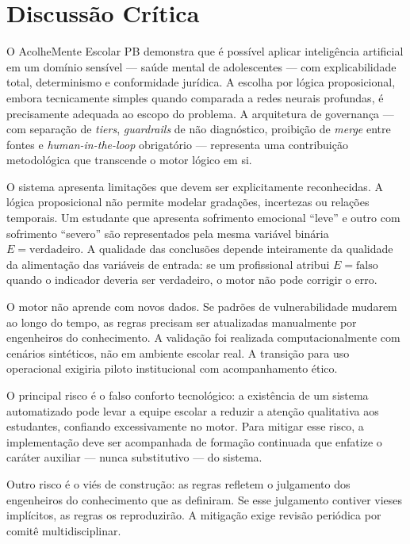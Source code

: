 \documentclass[
    12pt,
    openright,
    oneside,
    a4paper,
    english,
    brazil
]{abntex2}
\begin{document}
\chapter{Discussão Crítica}

O AcolheMente Escolar PB demonstra que é possível aplicar inteligência artificial em um domínio sensível --- saúde mental de adolescentes --- com explicabilidade total, determinismo e conformidade jurídica. A escolha por lógica proposicional, embora tecnicamente simples quando comparada a redes neurais profundas, é precisamente adequada ao escopo do problema. A arquitetura de governança --- com separação de \textit{tiers}, \textit{guardrails} de não diagnóstico, proibição de \textit{merge} entre fontes e \textit{human-in-the-loop} obrigatório --- representa uma contribuição metodológica que transcende o motor lógico em si.

O sistema apresenta limitações que devem ser explicitamente reconhecidas. A lógica proposicional não permite modelar gradações, incertezas ou relações temporais. Um estudante que apresenta sofrimento emocional ``leve'' e outro com sofrimento ``severo'' são representados pela mesma variável binária $E = \text{verdadeiro}$. A qualidade das conclusões depende inteiramente da qualidade da alimentação das variáveis de entrada: se um profissional atribui $E = \text{falso}$ quando o indicador deveria ser verdadeiro, o motor não pode corrigir o erro.

O motor não aprende com novos dados. Se padrões de vulnerabilidade mudarem ao longo do tempo, as regras precisam ser atualizadas manualmente por engenheiros do conhecimento. A validação foi realizada computacionalmente com cenários sintéticos, não em ambiente escolar real. A transição para uso operacional exigiria piloto institucional com acompanhamento ético.

O principal risco é o falso conforto tecnológico: a existência de um sistema automatizado pode levar a equipe escolar a reduzir a atenção qualitativa aos estudantes, confiando excessivamente no motor. Para mitigar esse risco, a implementação deve ser acompanhada de formação continuada que enfatize o caráter auxiliar --- nunca substitutivo --- do sistema.

Outro risco é o viés de construção: as regras refletem o julgamento dos engenheiros do conhecimento que as definiram. Se esse julgamento contiver vieses implícitos, as regras os reproduzirão. A mitigação exige revisão periódica por comitê multidisciplinar.
\end{document}
